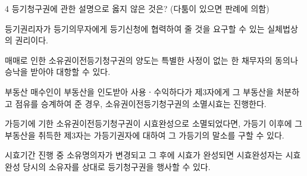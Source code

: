 \begin{question}{4}
등기청구권에 관한 설명으로 옳지 않은 것은? (다툼이 있으면 판례에 의함)
\begin{choices}
  \item 등기권리자가 등기의무자에게 등기신청에 협력하여 줄 것을 요구할 수 있는 실체법상의 권리이다.
  \item 매매로 인한 소유권이전등기청구권의 양도는 특별한 사정이 없는 한 채무자의 동의나 승낙을 받아야 대항할 수 있다.
  \item 부동산 매수인이 부동산을 인도받아 사용ㆍ수익하다가 제3자에게 그 부동산을 처분하고 점유를 승계하여 준 경우, 소유권이전등기청구권의 소멸시효는 진행한다.
  \item 가등기에 기한 소유권이전등기청구권이 시효완성으로 소멸되었다면, 가등기 이후에 그 부동산을 취득한 제3자는 가등기권자에 대하여 그 가등기의 말소를 구할 수 있다.
  \item 시효기간 진행 중 소유명의자가 변경되고 그 후에 시효가 완성되면 시효완성자는 시효완성 당시의 소유자를 상대로 등기청구권을 행사할 수 있다.
\end{choices}
\end{question}
